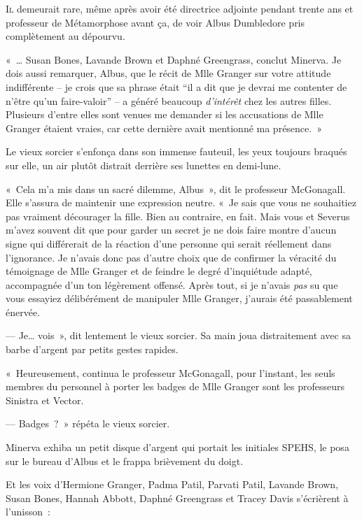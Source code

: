 
\lettrine{I}{l} demeurait rare, même après avoir été directrice adjointe pendant trente ans et professeur de Métamorphose avant ça, de voir Albus Dumbledore pris complètement au dépourvu.

«~… Susan Bones, Lavande Brown et Daphné Greengrass, conclut Minerva. Je dois aussi remarquer, Albus, que le récit de Mlle Granger sur votre attitude indifférente -- je crois que sa phrase était “il a dit que je devrai me contenter de n'être qu'un faire-valoir” -- a généré beaucoup \emph{d'intérêt} chez les autres filles. Plusieurs d'entre elles sont venues me demander si les accusations de Mlle Granger étaient vraies, car cette dernière avait mentionné ma présence.~»

Le vieux sorcier s'enfonça dans son immense fauteuil, les yeux toujours braqués sur elle, un air plutôt distrait derrière ses lunettes en demi-lune.

«~Cela m'a mis dans un sacré dilemme, Albus~», dit le professeur McGonagall. Elle s'assura de maintenir une expression neutre. «~Je sais que vous ne souhaitiez pas vraiment décourager la fille. Bien au contraire, en fait. Mais vous et Severus m'avez souvent dit que pour garder un secret je ne dois faire montre d'aucun signe qui différerait de la réaction d'une personne qui serait réellement dans l'ignorance. Je n'avais donc pas d'autre choix que de confirmer la véracité du témoignage de Mlle Granger et de feindre le degré d'inquiétude adapté, accompagnée d'un ton légèrement offensé. Après tout, si je n'avais \emph{pas} su que vous essayiez délibérément de manipuler Mlle Granger, j'aurais été passablement énervée.

--- Je… vois~», dit lentement le vieux sorcier. Sa main joua distraitement avec sa barbe d'argent par petits gestes rapides.

«~Heureusement, continua le professeur McGonagall, pour l'instant, les seuls membres du personnel à porter les badges de Mlle Granger sont les professeurs Sinistra et Vector.

--- Badges~?~» répéta le vieux sorcier.

Minerva exhiba un petit disque d'argent qui portait les initiales SPEHS, le posa sur le bureau d'Albus et le frappa brièvement du doigt.

Et les voix d'Hermione Granger, Padma Patil, Parvati Patil, Lavande Brown, Susan Bones, Hannah Abbott, Daphné Greengrass et Tracey Davis s'écrièrent à l'unisson~:

